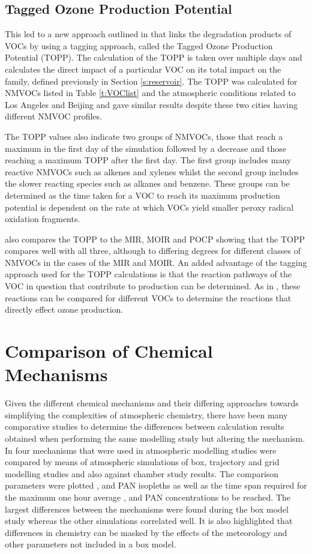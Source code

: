 \subsection{Tagged Ozone Production Potential} \label{s:TOPP}
This led to a new approach outlined in \citep{Butler:2011} that links the degradation products of VOCs by using a tagging approach, called the Tagged Ozone Production Potential (TOPP). 
The calculation of the TOPP is taken over multiple days and calculates the direct impact of a particular VOC on its total impact on the  family, defined previously in Section \ref{s:reservoir}. 
The TOPP was calculated for NMVOCs listed in Table \ref{t:VOClist} and the atmospheric conditions related to Los Angeles and Beijing and gave similar results despite these two cities having different NMVOC profiles. 

The TOPP values also indicate two groups of NMVOCs, those that reach a maximum in the first day of the simulation followed by a decrease and those reaching a maximum TOPP after the first day. 
The first group includes many reactive NMVOCs such as alkenes and xylenes whilst the second group includes the slower reacting species such as alkanes and benzene. 
These groups can be determined as the time taken for a VOC to reach its maximum  production potential is dependent on the rate at which VOCs yield smaller peroxy radical oxidation fragments. 

\citep{Butler:2011} also compares the TOPP to the MIR, MOIR and POCP showing that the TOPP compares well with all three, although to differing degrees for different classes of NMVOCs in the cases of the MIR and MOIR. 
An added advantage of the tagging approach used for the TOPP calculations is that the reaction pathways of the VOC in question that contribute to  production can be determined. 
As in \citep{Butler:2011}, these reactions can be compared for different VOCs to determine the reactions that directly effect ozone production.

\section{Comparison of Chemical Mechanisms}
Given the different chemical mechanisms and their differing approaches towards simplifying the complexities of atmospheric chemistry, there have been many comparative studies to determine the differences between calculation results obtained when performing the same modelling study but altering the mechanism. 
In \citep{Dunker:1984} four mechanisms that were used in atmospheric modelling studies were compared by means of atmospheric simulations of box, trajectory and grid modelling studies and also against chamber study results. 
The comparison parameters were plotted ,  and PAN isopleths as well as the time span required for the maximum one hour average ,  and PAN concentrations to be reached. 
The largest differences between the mechanisms were found during the box model study whereas the other simulations correlated well. 
It is also highlighted that differences in chemistry can be masked by the effects of the meteorology and other parameters not included in a box model.

